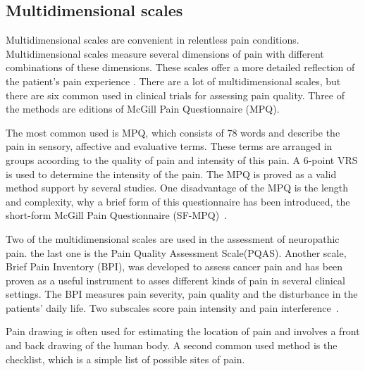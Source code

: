 \subsection{Multidimensional scales} 
Multidimensional scales are convenient in relentless pain conditions. Multidimensional scales measure several dimensions of pain with different combinations of these dimensions. These scales offer a more detailed reflection of the patient's pain experience \cite{Briggs2010}. 
There are a lot of multidimensional scales, but there are six common used in clinical trials for assessing pain quality. Three of the methods are editions of McGill Pain Questionnaire (MPQ).

The most common used is MPQ, which consists of 78 words and describe the pain in sensory, affective and evaluative terms. These terms are arranged in groups acoording to the quality of pain and intensity of this pain. A 6-point VRS is used to determine the intensity of the pain. The MPQ is proved as a valid method support by several studies. One disadvantage of the MPQ is the length and complexity, why a brief form of this questionnaire has been introduced, the short-form McGill Pain Questionnaire (SF-MPQ)~\cite{Katz2001}. 

Two of the multidimensional scales  are used in the assessment of neuropathic pain.   the last one is the Pain Quality Assessment Scale(PQAS). Another scale, Brief Pain Inventory (BPI), was developed to assess cancer pain and has been proven as a useful instrument to asses different kinds of pain in several clinical settings. The BPI measures pain severity, pain quality and the disturbance in the patients' daily life. Two subscales score pain intensity and pain interference~\cite{Katz2001}.  

Pain drawing is often used for estimating the location of pain and involves a front and back drawing of the human body. A second common used method is the checklist, which is a simple list of possible sites of pain.~\cite{Jensen2001} 



